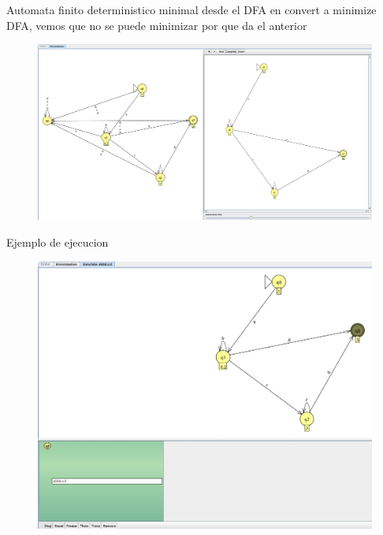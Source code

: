\documentclass{article}
\begin{document}
        Automata finito deterministico minimal
        desde el DFA en convert a minimize DFA, vemos que no se puede minimizar por que da el anterior
        \begin{figure}[!h]
            \centering
            \includegraphics[width=1.2\textwidth]{./Imagenes/image12.png}
            \label{fig:label4}
        \end{figure}


        Ejemplo de ejecucion
        \begin{figure}[!h]
            \centering
            \includegraphics[width=1.2\textwidth]{./Imagenes/image13.png}
            \label{fig:label4}
        \end{figure}



            

        \newpage

\end{document}
